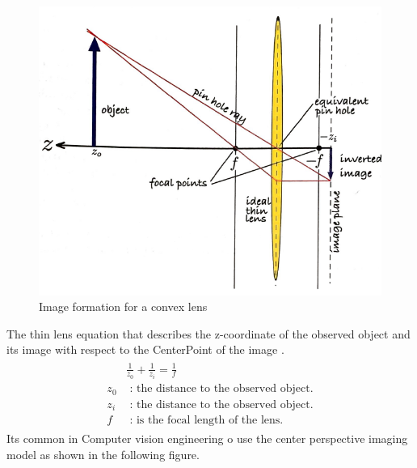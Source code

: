 \documentclass[journal,final,a4paper,twoside]{PS}
\begin{document}
\begin{figure}[h]
\begin{center}
\includegraphics[scale=0.5]{./pics/imageFormationGeometry.png}
\caption{Image formation for a convex lens \cite{Corke}}
\label{fig:imageGeometry}
\end{center}
\end{figure}
The thin lens equation that describes the z-coordinate of the observed object and its image with respect to the CenterPoint of the image \cite{Corke}.
\begin{align}\begin{split}
&\frac{1}{z_0}+\frac{1}{z_i}=\frac{1}{f}\\
z_0&\text{ : the distance to the observed object.}\\
z_i&\text{ : the distance to the observed object.}\\
f&\text{ : is the focal length of the lens.}\end{split}
\end{align}
Its common in Computer vision engineering o use the center perspective imaging model  as shown in the following figure.
\\
\end{document}
